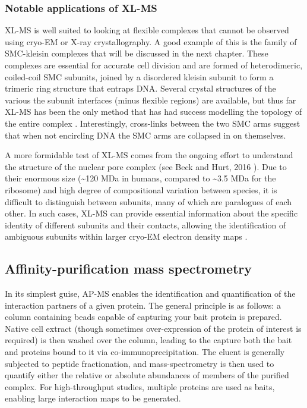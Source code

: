 \documentclass[a4paper,11pt,twoside,openright]{scrbook}
\begin{document}

\subsubsection{Notable applications of XL-MS}
XL-MS is well suited to looking at flexible complexes that cannot be observed using cryo-EM or X-ray crystallography. A good example of this is the family of SMC-kleisin complexes that will be discussed in the next chapter. These complexes are essential for accurate cell division and are formed of heterodimeric, coiled-coil SMC subunits, joined by a disordered kleisin subunit to form a trimeric ring structure that entraps DNA. Several crystal structures of the various the subunit interfaces (minus flexible regions) are available, but thus far XL-MS has been the only method that has had success modelling the topology of the entire complex \cite{Barysz2015}. Interestingly, cross-links between the two SMC arms suggest that when not encircling DNA the SMC arms are collapsed in on themselves.

A more formidable test of XL-MS comes from the ongoing effort to understand the structure of the nuclear pore complex (see Beck and Hurt, 2016 \cite{Beck2016}). Due to their enormous size (\textasciitilde 120 MDa in humans, compared to \textasciitilde 3.5 MDa for the ribosome) and high degree of compositional variation between species, it is difficult to distinguish between subunits, many of which are paralogues of each other. In such cases, XL-MS can provide essential information about the specific identity of different subunits and their contacts, allowing the identification of ambiguous subunits within larger cryo-EM electron density maps \cite{Bui2013,Shi2014a}.

\subsection{Affinity-purification mass spectrometry}
In its simplest guise, AP-MS enables the identification and quantification of the interaction partners of a given protein. The general principle is as follows: a column containing beads capable of capturing your bait protein is prepared. Native cell extract (though sometimes over-expression of the protein of interest is required) is then washed over the column, leading to the capture both the bait and proteins bound to it via co-immunoprecipitation. The eluent is generally subjected to peptide fractionation, and mass-spectrometry is then used to quantify either the relative or absolute abundances of members of the purified complex. For high-throughput studies, multiple proteins are used as baits, enabling large interaction maps to be generated.
\end{document}
